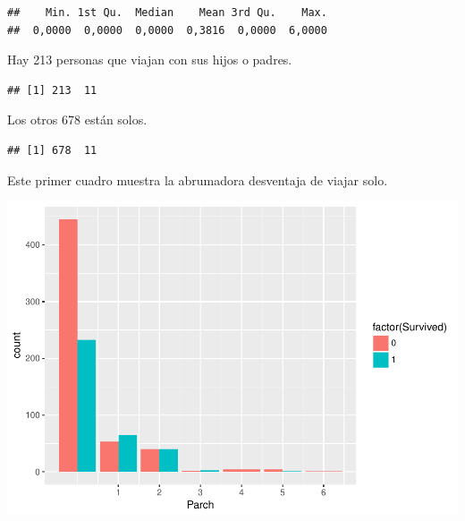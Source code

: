 \documentclass[]{article}
\newenvironment{Shaded}{\begin{snugshade}}{\end{snugshade}}
\newcommand{\KeywordTok}[1]{\textcolor[rgb]{0.13,0.29,0.53}{\textbf{#1}}}
\newcommand{\DecValTok}[1]{\textcolor[rgb]{0.00,0.00,0.81}{#1}}
\newcommand{\StringTok}[1]{\textcolor[rgb]{0.31,0.60,0.02}{#1}}
\newcommand{\OperatorTok}[1]{\textcolor[rgb]{0.81,0.36,0.00}{\textbf{#1}}}
\newcommand{\NormalTok}[1]{#1}
\begin{document}
\begin{verbatim}
##    Min. 1st Qu.  Median    Mean 3rd Qu.    Max. 
##  0,0000  0,0000  0,0000  0,3816  0,0000  6,0000
\end{verbatim}

Hay 213 personas que viajan con sus hijos o padres.

\begin{Shaded}
\end{Shaded}

\begin{verbatim}
## [1] 213  11
\end{verbatim}

Los otros 678 están solos.

\begin{Shaded}
\end{Shaded}

\begin{verbatim}
## [1] 678  11
\end{verbatim}

Este primer cuadro muestra la abrumadora desventaja de viajar solo.

\includegraphics{titanicDataClean_files/figure-latex/unnamed-chunk-4-1.pdf}
\end{document}
